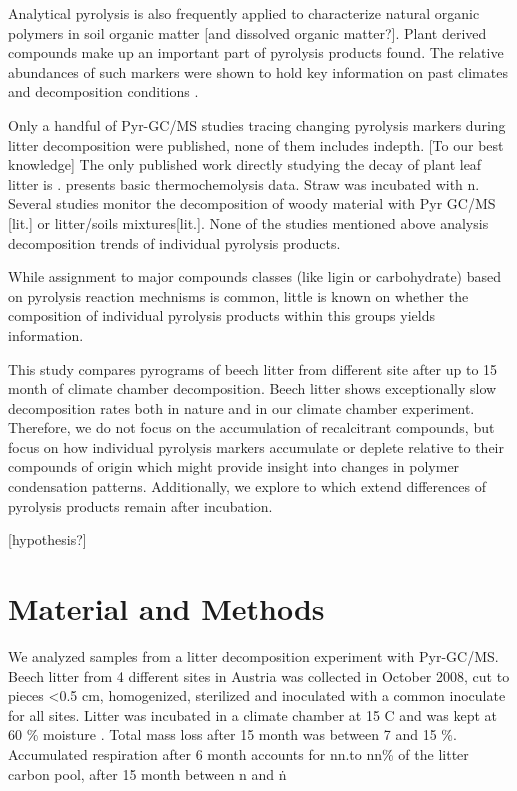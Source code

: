 \documentclass[preprint,review,12pt]{elsarticle}
\begin{document}
Analytical pyrolysis is also frequently applied to characterize natural organic polymers in soil organic matter [and dissolved organic matter?]. Plant derived compounds make up an important part of pyrolysis products found. The relative abundances of such markers were shown to hold key information on past climates and decomposition conditions \cite{i.e. Kuder1998, Schellekens2009, Schellekens2011}. 

Only a handful of Pyr-GC/MS studies tracing changing pyrolysis markers during litter decomposition were published, none of them includes indepth. [To our best knowledge] The only published work directly studying the decay of plant leaf litter is \cite{Franchini2002}. \cite{Snajdr2010} presents basic thermochemolysis data.  Straw was incubated with n. Several studies monitor the decomposition of woody material with Pyr GC/MS [lit.] or litter/soils mixtures[lit.]. None of the studies mentioned above analysis decomposition trends of individual pyrolysis products.

While assignment to major compounds classes (like ligin or carbohydrate) based on pyrolysis reaction mechnisms is common, little is known on whether the composition of individual pyrolysis products within this groups yields information. 

This study compares pyrograms of beech litter from different site after up to 15 month of climate chamber decomposition. Beech litter shows exceptionally slow decomposition rates both in nature \citep{Klotzbucher2011} and in our climate chamber experiment. Therefore, we do not focus on the accumulation of recalcitrant compounds, but focus on how individual pyrolysis markers accumulate or deplete relative to their compounds of origin which might provide insight into changes in polymer condensation patterns. Additionally, we explore to which extend differences of pyrolysis products remain after incubation.

[hypothesis?]

\section{Material and Methods}

We analyzed samples from a litter decomposition experiment with Pyr-GC/MS. Beech litter from 4 different sites in Austria was collected in October 2008, cut to pieces \textless 0.5 cm, homogenized, sterilized and inoculated with a common inoculate for all sites. Litter was incubated in a climate chamber at 15 \textdegree C and was kept at 60 \% moisture \citep{Wanek2010}.
Total mass loss after 15 month was between 7 and 15 \%.
Accumulated respiration after 6 month accounts for nn.to nn\% of the litter carbon pool, after 15 month between n and n\.
\end{document}
